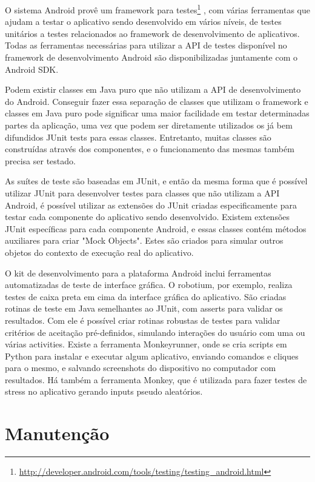 O sistema Android provê um framework para testes\footnote{\url{http://developer.android.com/tools/testing/testing\_android.html}} , com várias ferramentas que ajudam a testar o aplicativo sendo desenvolvido em vários níveis, de testes unitários a testes relacionados ao framework de desenvolvimento de aplicativos. Todas as ferramentas necessárias para utilizar a API de testes disponível no framework de desenvolvimento Android são disponibilizadas juntamente com o Android SDK.

Podem existir classes em Java puro que não utilizam a API de desenvolvimento do Android. Conseguir fazer essa separação de classes que utilizam o framework e classes em Java puro pode significar uma maior facilidade em testar determinadas partes da aplicação, uma vez que podem ser diretamente utilizados os já bem difundidos JUnit tests para essas classes. Entretanto, muitas classes são construídas através dos componentes, e o funcionamento das mesmas também precisa ser testado.

As suítes de teste são baseadas em JUnit, e então da mesma forma que é possível utilizar JUnit para desenvolver testes para classes que não utilizam a API Android, é possível utilizar as extensões do JUnit criadas especificamente para testar cada componente do aplicativo sendo desenvolvido. Existem extensões JUnit específicas para cada componente Android, e essas classes contém métodos auxiliares para criar "Mock Objects". Estes são criados para simular outros objetos do contexto de execução real do aplicativo.

O kit de desenvolvimento para a plataforma Android inclui ferramentas automatizadas de teste de interface gráfica. O robotium, por exemplo, realiza testes de caixa preta em cima da interface gráfica do aplicativo. São criadas rotinas de teste em Java semelhantes ao JUnit, com asserts para validar os resultados. Com ele é possível criar rotinas robustas de testes para validar critérios de aceitação pré-definidos, simulando interações do usuário com uma ou várias activities. Existe a ferramenta Monkeyrunner, onde se cria scripts em Python para instalar e executar algum aplicativo, enviando comandos e cliques para o mesmo, e salvando screenshots do dispositivo no computador com resultados. Há também a ferramenta Monkey, que é utilizada para fazer testes de stress no aplicativo gerando inputs pseudo aleatórios.

\section{Manutenção}

